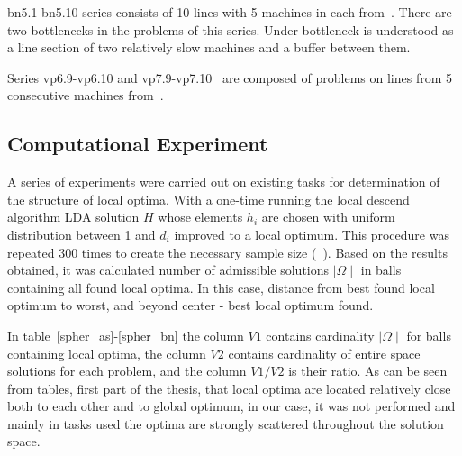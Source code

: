 \documentclass{ifacconf}
\begin{document}
bn5.1-bn5.10 series consists of 10 lines with 5 machines in
each from~\cite{eng1}. There are two bottlenecks in the problems of this series. Under
bottleneck is understood as a line section of two relatively slow machines and a buffer
between them. 

Series vp6.9-vp6.10 and vp7.9-vp7.10~\cite{vp} are composed of problems on lines from
5 consecutive machines from~\cite{vp}. 


\subsection{Computational Experiment} \label{subsec:experiment}

A series of experiments were carried out on existing tasks for
determination of the structure of local optima. With a one-time
running the local descend algorithm LDA solution $H$ whose elements $h_i$ are chosen with
uniform distribution between 1 and $d_i$ improved to a local optimum.
This procedure was repeated 300 times to create the necessary
sample size (~\cite{Boese}). Based on the results obtained, it was calculated
number of admissible solutions $\mid \Omega \mid$ in balls containing all found
local optima. In this case, distance from
best found local optimum to worst, and beyond center - best local optimum found.

In table~\ref{spher_as}-\ref{spher_bn} the column $V1$ contains cardinality $\mid \Omega \mid$ for balls containing
local
optima, the column $V2$ contains cardinality of entire space
solutions for each problem, and the column $V1/V2$ is their ratio.
As can be seen from tables, first part of the thesis, that
local optima are located relatively close both to each other and to global optimum,
in our case, it was not performed and mainly in tasks used
the optima are strongly scattered throughout the solution space.
\end{document}
